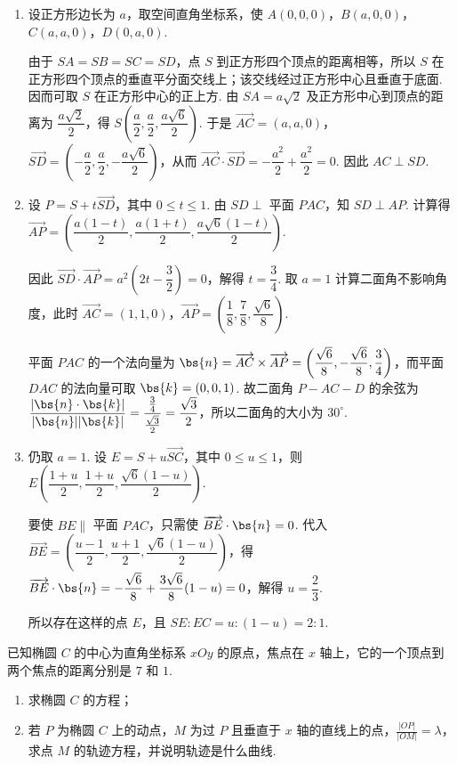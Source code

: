 \begin{solution}
\begin{enumerate}
\item 设正方形边长为 \(a\)，取空间直角坐标系，使
\(A(0,0,0)\)，\(B(a,0,0)\)，\(C(a,a,0)\)，\(D(0,a,0)\).

由于 \(SA=SB=SC=SD\)，点 \(S\) 到正方形四个顶点的距离相等，所以 \(S\) 在正方形四个顶点的垂直平分面交线上；该交线经过正方形中心且垂直于底面. 因而可取 \(S\) 在正方形中心的正上方. 由 \(SA=a\sqrt{2}\) 及正方形中心到顶点的距离为 \(\dfrac{a\sqrt{2}}{2}\)，得
\(S\left(\dfrac{a}{2},\dfrac{a}{2},\dfrac{a\sqrt{6}}{2}\right)\). 于是
\(\overrightarrow{AC}=(a,a,0)\)，\(\overrightarrow{SD}=\left(-\dfrac{a}{2},\dfrac{a}{2},-\dfrac{a\sqrt{6}}{2}\right)\)，从而
\(\overrightarrow{AC}\cdot\overrightarrow{SD}=-\dfrac{a^2}{2}+\dfrac{a^2}{2}=0\). 因此 \(AC\perp SD\).
\item 设 \(P=S+t\overrightarrow{SD}\)，其中 \(0\leqslant t\leqslant1\). 由 \(SD\perp\) 平面 \(PAC\)，知 \(SD\perp AP\). 计算得
\(\overrightarrow{AP}=\left(\dfrac{a(1-t)}{2},\dfrac{a(1+t)}{2},\dfrac{a\sqrt{6}(1-t)}{2}\right)\).

因此
\(\overrightarrow{SD}\cdot\overrightarrow{AP}=a^2\left(2t-\dfrac{3}{2}\right)=0\)，解得 \(t=\dfrac{3}{4}\). 取 \(a=1\) 计算二面角不影响角度，此时
\(\overrightarrow{AC}=(1,1,0)\)，\(\overrightarrow{AP}=\left(\dfrac18,\dfrac78,\dfrac{\sqrt6}{8}\right)\).

平面 \(PAC\) 的一个法向量为
\(\bs{n}=\overrightarrow{AC}\times\overrightarrow{AP}=\left(\dfrac{\sqrt6}{8},-\dfrac{\sqrt6}{8},\dfrac34\right)\)，而平面 \(DAC\) 的法向量可取 \(\bs{k}=(0,0,1)\). 故二面角 \(P-AC-D\) 的余弦为
\(\dfrac{|\bs{n}\cdot\bs{k}|}{|\bs{n}||\bs{k}|}=\dfrac{\frac{3}{4}}{\frac{\sqrt3}{2}}=\dfrac{\sqrt3}{2}\)，所以二面角的大小为 \(30^{\circ}\).
\item 仍取 \(a=1\). 设 \(E=S+u\overrightarrow{SC}\)，其中 \(0\leqslant u\leqslant1\)，则
\(E\left(\dfrac{1+u}{2},\dfrac{1+u}{2},\dfrac{\sqrt6(1-u)}{2}\right)\).

要使 \(BE\parallel\) 平面 \(PAC\)，只需使 \(\overrightarrow{BE}\cdot\bs{n}=0\). 代入
\(\overrightarrow{BE}=\left(\dfrac{u-1}{2},\dfrac{u+1}{2},\dfrac{\sqrt6(1-u)}{2}\right)\)，得
\(\overrightarrow{BE}\cdot\bs{n}=-\dfrac{\sqrt6}{8}+\dfrac{3\sqrt6}{8}(1-u)=0\)，解得 \(u=\dfrac23\).

所以存在这样的点 \(E\)，且 \(SE:EC=u:(1-u)=2:1\).
\end{enumerate}
\end{solution}

\begin{problem}
已知椭圆 \(C\) 的中心为直角坐标系 \(xOy\) 的原点，焦点在 \(x\) 轴上，它的一个顶点到两个焦点的距离分别是 \(7\) 和 \(1\).

\begin{enumerate}
\item 求椭圆 \(C\) 的方程；
\item 若 \(P\) 为椭圆 \(C\) 上的动点，\(M\) 为过 \(P\) 且垂直于 \(x\) 轴的直线上的点，\(\frac{|OP|}{|OM|} = \lambda\)，求点 \(M\) 的轨迹方程，并说明轨迹是什么曲线.
\end{enumerate}
\end{problem}

